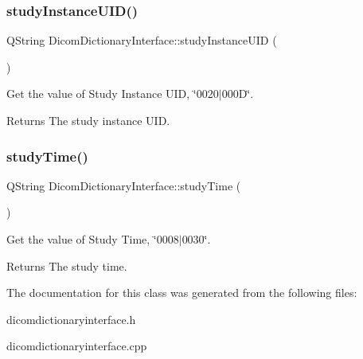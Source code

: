 \subsubsection{\texorpdfstring{study\+Instance\+U\+I\+D()}{studyInstanceUID()}}
{\footnotesize\ttfamily Q\+String Dicom\+Dictionary\+Interface\+::study\+Instance\+U\+ID (\begin{DoxyParamCaption}{ }\end{DoxyParamCaption})}



Get the value of Study Instance U\+ID, \char`\"{}0020$\vert$000\+D\char`\"{}. 

\begin{DoxyReturn}{Returns}
The study instance U\+ID. 
\end{DoxyReturn}
\mbox{\label{class_dicom_dictionary_interface_a0b8855598a148d2a15828808dd3f62f3}} 
\subsubsection{\texorpdfstring{study\+Time()}{studyTime()}}
{\footnotesize\ttfamily Q\+String Dicom\+Dictionary\+Interface\+::study\+Time (\begin{DoxyParamCaption}{ }\end{DoxyParamCaption})}



Get the value of Study Time, \char`\"{}0008$\vert$0030\char`\"{}. 

\begin{DoxyReturn}{Returns}
The study time. 
\end{DoxyReturn}


The documentation for this class was generated from the following files\+:\begin{DoxyCompactItemize}
\item 
dicomdictionaryinterface.\+h\item 
dicomdictionaryinterface.\+cpp\end{DoxyCompactItemize}
